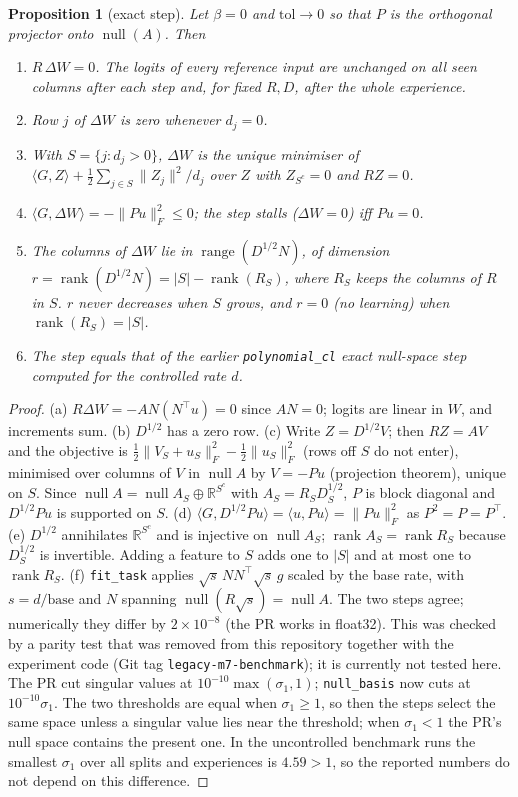 \documentclass[11pt,a4paper]{article}
\newtheorem{prop}{Proposition}
\theoremstyle{remark}\newtheorem*{rem}{Remark}
\newcommand{\R}{\mathbb{R}}
\DeclareMathOperator{\rank}{rank}
\DeclareMathOperator{\nul}{null}
\begin{document}
\begin{prop}[exact step]\label{p:sb}
Let $\beta=0$ and $\mathrm{tol}\to0$ so that $P$ is the orthogonal projector onto $\nul(A)$. Then
\begin{enumerate}[label=(\alph*)]
\item $R\,\Delta W=0$. The logits of every reference input are unchanged on all seen columns after
each step and, for fixed $R,D$, after the whole experience.
\item Row $j$ of $\Delta W$ is zero whenever $d_j=0$.
\item With $S=\{j:d_j>0\}$, $\Delta W$ is the unique minimiser of
$\langle G,Z\rangle+\tfrac12\sum_{j\in S}\|Z_{j}\|^2/d_j$ over $Z$ with $Z_{S^c}=0$ and $RZ=0$.
\item $\langle G,\Delta W\rangle=-\|Pu\|_F^2\le0$; the step stalls ($\Delta W=0$) iff $Pu=0$.
\item The columns of $\Delta W$ lie in $\operatorname{range}(D^{1/2}N)$, of dimension
$r=\rank(D^{1/2}N)=|S|-\rank(R_S)$, where $R_S$ keeps the columns of $R$ in $S$. $r$ never decreases when $S$
grows, and $r=0$ (no learning) when $\rank(R_S)=|S|$.
\item The step equals that of the earlier \texttt{polynomial\_cl} exact null-space step computed for the controlled rate $d$.
\end{enumerate}
\end{prop}
\begin{proof}
(a) $R\Delta W=-AN(N^\top u)=0$ since $AN=0$; logits are linear in $W$, and increments sum.
(b) $D^{1/2}$ has a zero row. (c) Write $Z=D^{1/2}V$; then $RZ=AV$ and the objective is
$\tfrac12\|V_S+u_S\|_F^2-\tfrac12\|u_S\|_F^2$ (rows off $S$ do not enter), minimised over columns of
$V$ in $\nul A$ by $V=-Pu$ (projection theorem), unique on $S$. Since $\nul A=\nul A_S\oplus\R^{S^c}$ with
$A_S=R_SD_S^{1/2}$, $P$ is block diagonal and $D^{1/2}Pu$ is supported on $S$.
(d) $\langle G,D^{1/2}Pu\rangle=\langle u,Pu\rangle=\|Pu\|_F^2$ as $P^2=P=P^\top$.
(e) $D^{1/2}$ annihilates $\R^{S^c}$ and is injective on $\nul A_S$; $\rank A_S=\rank R_S$ because $D_S^{1/2}$ is invertible.
Adding a feature to $S$ adds one to $|S|$ and at most one to $\rank R_S$.
(f) \texttt{fit\_task} applies $\sqrt{s}\,NN^\top\!\sqrt{s}\,g$ scaled by the base rate, with $s=d/\text{base}$ and $N$
spanning $\nul(R\sqrt{s})=\nul A$. The two steps agree; numerically they differ by $2\!\times\!10^{-8}$
(the PR works in float32). This was checked by a parity test that was removed from this repository together with the experiment code (Git tag \texttt{legacy-m7-benchmark}); it is currently not tested here.
The PR cut singular values at $10^{-10}\max(\sigma_1,1)$; \texttt{null\_basis} now cuts at $10^{-10}\sigma_1$. The two thresholds are equal when $\sigma_1\ge1$, so then the steps select the same space unless a singular value lies near the threshold; when $\sigma_1<1$ the PR's null space contains the present one. In the uncontrolled benchmark runs the smallest $\sigma_1$ over all splits and experiences is $4.59>1$, so the reported numbers do not depend on this difference.
\end{proof}
\end{document}
